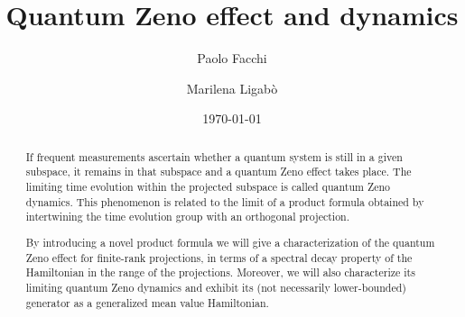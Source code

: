 \documentclass[aip,jmp
]{revtex4}
\theoremstyle{definition}
\begin{document}

\title{Quantum Zeno effect and dynamics} %



\author{Paolo Facchi}


\author{Marilena Ligab\`o}


\date{\today}

\begin{abstract}
If frequent measurements ascertain whether a quantum system is still in a given subspace, it remains in that subspace and a quantum Zeno effect takes place. The limiting time evolution within the projected subspace is called quantum Zeno dynamics. This phenomenon is related to the limit of a product formula obtained by intertwining the time evolution group with an orthogonal projection.

By introducing a novel product formula we will give a characterization of the  quantum Zeno effect for finite-rank projections, in terms of a spectral decay property of the  Hamiltonian in the range of the projections.
Moreover, we will also characterize its limiting quantum Zeno dynamics and exhibit its (not necessarily lower-bounded) generator as a generalized mean value Hamiltonian.
\end{abstract}
\end{document}
